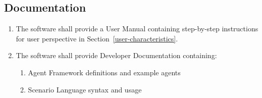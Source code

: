 \documentclass[titlepage]{article}
\begin{document}

\subsection{Documentation%
  \label{documentation}%
}
\begin{enumerate}
    \item The software shall provide a User Manual containing step-by-step instructions for user perspective in Section~\ref{user-characteristics}.
    \item The software shall provide Developer Documentation containing:
    \begin{enumerate}
        \item Agent Framework definitions and example agents
        \item Scenario Language syntax and usage
    \end{enumerate}
\end{enumerate}


\appendix
\pagebreak
\end{document}
